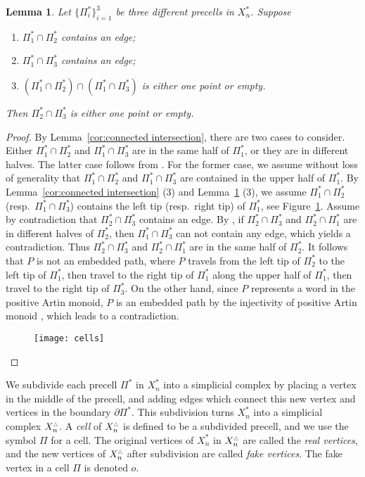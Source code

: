 \documentclass[11pt]{amsart}
\newtheorem{lemma}[theorem]{Lemma}
\theoremstyle{definition}
\newcommand{\Xa}{X^{\ast}}
\newcommand{\Pa}{\Pi^{\ast}}
\newcommand{\Xb}{X^{\scalebox{0.53}{$\triangle$}}}
\begin{document}
\begin{lemma}
	\label{lem:small intersection}
	Let $\{\Pa_i\}_{i=1}^3$ be three different precells in $\Xa_n$. Suppose
\begin{enumerate}
	\item $\Pa_1\cap\Pa_2$ contains an edge;
	\item $\Pa_1\cap\Pa_3$ contains an edge;
	\item $(\Pa_1\cap\Pa_2)\cap(\Pa_1\cap\Pa_3)$ is either one point or empty.
\end{enumerate}	
Then $\Pa_2\cap\Pa_3$ is either one point or empty.
\end{lemma}

\begin{proof}
By Lemma~\ref{cor:connected intersection}, there are two cases to consider. Either $\Pa_1\cap\Pa_2$ and $\Pa_1\cap\Pa_3$ are in the same half of $\Pa_1$, or they are in different halves. The latter case follows from \cite[Corollary 3.5]{Artinsystolic}. For the former case, we assume without loss of generality that $\Pa_1\cap\Pa_2$ and $\Pa_1\cap\Pa_3$ are contained in the upper half of $\Pa_1$. By Lemma~\ref{cor:connected intersection} (3) and Lemma~\ref{lem:small intersection} (3), we assume $\Pa_1\cap \Pa_2$ (resp.\ $\Pa_1\cap \Pa_3$) contains the left tip (resp.\ right tip) of $\Pa_1$, see Figure~\ref{f:cells}. Assume by contradiction that $\Pa_2\cap\Pa_3$ contains an edge. By \cite[Corollary 3.5]{Artinsystolic}, if $\Pa_2\cap\Pa_3$ and $\Pa_2\cap\Pa_1$ are in different halves of $\Pa_2$, then $\Pa_1\cap\Pa_3$ can not contain any edge, which yields a contradiction. Thus $\Pa_2\cap\Pa_3$ and $\Pa_2\cap\Pa_1$ are in the same half of $\Pa_2$. It follows that $P$ is not an embedded path, where $P$ travels from the left tip of $\Pa_2$ to the left tip of $\Pa_1$, then travel to the right tip of $\Pa_1$ along the upper half of $\Pa_1$, then travel to the right tip of $\Pa_3$. On the other hand, since $P$ represents a word in the positive Artin monoid, $P$ is an embedded path by the injectivity of positive Artin monoid \cite{deligne,brieskorn1972artin}, which leads to a contradiction.
\begin{figure}[ht!]
	\centering
	\texttt{[image: cells]}
	\caption{}
	\label{f:cells}
\end{figure}
\end{proof}

We subdivide each precell $\Pa$ in $\Xa_n$ into a simplicial complex by placing a vertex in the middle of the precell, and adding edges which connect this new vertex and vertices in the boundary $\partial\Pa$. This subdivision turns $\Xa_n$ into a simplicial complex $\Xb_n$. A \emph{cell} of $\Xb_n$ is defined to be a subdivided precell, and we use the symbol $\Pi$ for a cell. 
The original vertices of $\Xa_n$ in $\Xb_n$ are called the \emph{real vertices}, and the new vertices of $\Xb_n$ after subdivision are called \emph{fake vertices}. The fake vertex in a cell $\Pi$ is denoted $o$.
\end{document}

